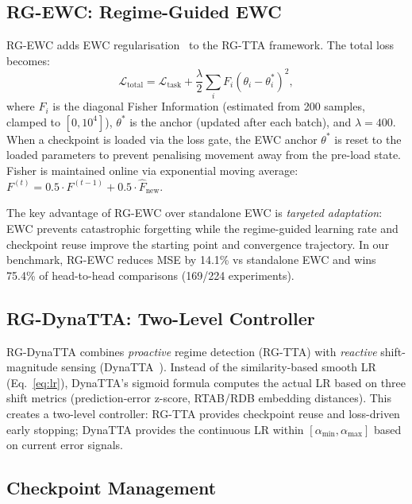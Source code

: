 \documentclass[journal]{IEEEtran}
\begin{document}
\subsection{RG-EWC: Regime-Guided EWC}
\label{sec:rg_ewc}

RG-EWC adds EWC regularisation~\cite{kirkpatrick2017ewc} to the RG-TTA framework. The total loss becomes:
\begin{equation}
  \mathcal{L}_{\text{total}} = \mathcal{L}_{\text{task}} + \frac{\lambda}{2} \sum_i F_i (\theta_i - \theta^*_i)^2,
  \label{eq:ewc}
\end{equation}
where $F_i$ is the diagonal Fisher Information (estimated from 200 samples, clamped to $[0, 10^4]$), $\theta^*$ is the anchor (updated after each batch), and $\lambda = 400$. When a checkpoint is loaded via the loss gate, the EWC anchor $\theta^*$ is reset to the loaded parameters to prevent penalising movement away from the pre-load state. Fisher is maintained online via exponential moving average: $F^{(t)} = 0.5 \cdot F^{(t-1)} + 0.5 \cdot \hat{F}_{\text{new}}$.

The key advantage of RG-EWC over standalone EWC is \emph{targeted adaptation}: EWC prevents catastrophic forgetting while the regime-guided learning rate and checkpoint reuse improve the starting point and convergence trajectory. In our benchmark, RG-EWC reduces MSE by 14.1\% vs standalone EWC and wins 75.4\% of head-to-head comparisons (169/224 experiments).

\subsection{RG-DynaTTA: Two-Level Controller}
\label{sec:rg_dynatta}

RG-DynaTTA combines \emph{proactive} regime detection (RG-TTA) with \emph{reactive} shift-magnitude sensing (DynaTTA~\cite{grover2025dynatta}). Instead of the similarity-based smooth LR (Eq.~\ref{eq:lr}), DynaTTA's sigmoid formula computes the actual LR based on three shift metrics (prediction-error z-score, RTAB/RDB embedding distances). This creates a two-level controller: RG-TTA provides checkpoint reuse and loss-driven early stopping; DynaTTA provides the continuous LR within $[\alpha_{\min}, \alpha_{\max}]$ based on current error signals.

\subsection{Checkpoint Management}
\label{sec:checkpoints}
\end{document}
